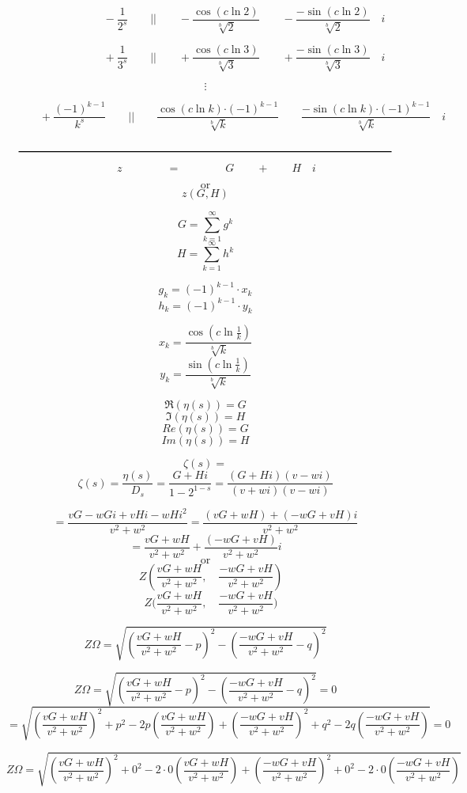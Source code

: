 \documentclass{amsart}
\begin{document}
	\[ \quad \qquad  \qquad \qquad -\frac{1}{2^s} \qquad \Big|\Big|  \qquad -\frac{\cos({c\ln 2})}{\sqrt[b]{2}} \qquad -\frac{-\sin({c\ln 2})}{\sqrt[b]{2}} \quad i  \]
	
	\[ \quad \qquad  \qquad \qquad +\frac{1}{3^s} \qquad \Big|\Big|  \qquad +\frac{\cos({c\ln 3})}{\sqrt[b]{3}} \qquad +\frac{-\sin({c\ln 3})}{\sqrt[b]{3}} \quad i  \]
	
	\[ \vdots \]
	
	\[ \qquad  \quad +\frac{(-1)^{k-1}}{k^s} \qquad \Big|\Big|  \qquad \frac{\cos({c\ln k}){\cdot(-1)^{k-1}}}{\sqrt[b]{k}} \qquad \frac{{-}\sin({c\ln k}){\cdot({-}1)^{k-1}}}{\sqrt[b]{k}} \quad i  \]
	
	\[\quad \rule{12 cm}{.8pt} \quad \]
	\[ \qquad \qquad \qquad z \qquad\qquad =  \qquad\qquad G \qquad + \qquad H \quad i \qquad\qquad \]
	
	\[ \text{or} \]
	\[ z (G, H) \]
	
	\[ G = \sum\limits_{k=1}^{\infty}g^k \]
	\[ H = \sum\limits_{k=1}^{\infty}h^k \]
	
	\[ g_k = (-1)^{k-1} \cdot x_k \]
	\[ h_k = (-1)^{k-1} \cdot y_k \]
	
	\[ x_k = \frac{\cos({c\ln \frac{1}{k}})}{\sqrt[b]{k}} \]
	\[ y_k = \frac{\sin({c\ln \frac{1}{k}})}{\sqrt[b]{k}} \]
	
	\[ \Re(\eta(s)) = G \]
	\[ \Im(\eta(s)) = H \]
	\[ Re(\eta(s)) = G \]
	\[ Im(\eta(s)) = H \]
	
	\[ \zeta(s) =  \]
	\[ \zeta(s) = \frac{\eta(s)}{D_{s}} = \frac{G + Hi}{1-2^{1-s}} = \frac{(G+Hi)(v-wi)}{(v+wi)(v-wi)} \]
	
	\[ = \frac{vG-wGi+vHi-wHi^2}{v^2+w^2} = \frac{(vG+wH)+(-wG+vH)i}{v^2+w^2} \]
	\[ = \frac{vG+wH}{v^2+w^2} + \frac{(-wG+vH)}{v^2+w^2}i \]
	\[ \text{or} \]
	\[ \quad Z(\frac{vG+wH}{v^2+w^2}, \quad \frac{-wG+vH}{v^2+w^2}) \]
	\[ \quad Z\biggr(\frac{vG+wH}{v^2+w^2}, \quad \frac{-wG+vH}{v^2+w^2}\biggl) \]
	\[\]
	
	
	\[ Z\Omega = \sqrt{(\frac{vG+wH}{v^2+w^2}-p)^2 - (\frac{-wG+vH}{v^2+w^2}-q)^2} \]
	
	\[ Z\Omega = \sqrt{(\frac{vG+wH}{v^2+w^2}-p)^2 - (\frac{-wG+vH}{v^2+w^2}-q)^2} = 0 \]
	\[ = \sqrt{  (\frac{vG{+}wH}{v^2{+}w^2})^2 {+} p^2 {-} 2p(\frac{vG{+}wH}{v^2{+}w^2}) {+} (\frac{-wG{+}vH}{v^2{+}w^2})^2 {+} q^2 {-}2q(\frac{-wG{+}vH}{v^2{+}w^2}) } = 0 \]
	
	\[ Z\Omega = \sqrt{  (\frac{vG{+}wH}{v^2{+}w^2})^2 {+} 0^2 {-} 2 {\cdot} 0 (\frac{vG{+}wH}{v^2{+}w^2}) {+} (\frac{-wG{+}vH}{v^2{+}w^2})^2 {+} 0^2 {-} 2 {\cdot} 0 (\frac{-wG{+}vH}{v^2{+}w^2}) } \]
	
\end{document}
